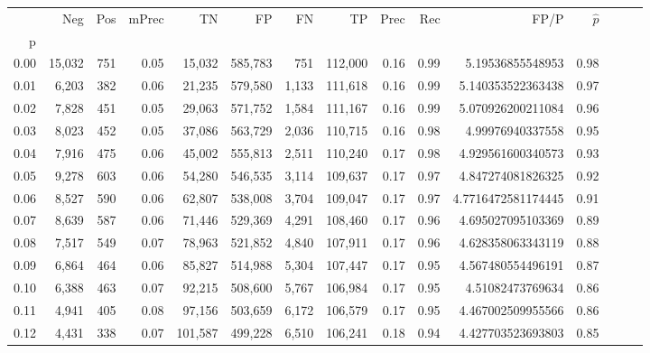 \begin{tabular}{rrrrrrrrrrrrrrr}
\toprule
{} &     Neg &    Pos & mPrec &       TN &       FP &       FN &       TP &  Prec &   Rec &                  FP/P & $\hat{p}$ \\
p    &         &        &       &          &          &          &          &       &       &                       &           \\
\midrule
0.00 &  15,032 &    751 &  0.05 &   15,032 &  585,783 &      751 &  112,000 &  0.16 &  0.99 &      5.19536855548953 &      0.98 \\
0.01 &   6,203 &    382 &  0.06 &   21,235 &  579,580 &    1,133 &  111,618 &  0.16 &  0.99 &     5.140353522363438 &      0.97 \\
0.02 &   7,828 &    451 &  0.05 &   29,063 &  571,752 &    1,584 &  111,167 &  0.16 &  0.99 &     5.070926200211084 &      0.96 \\
0.03 &   8,023 &    452 &  0.05 &   37,086 &  563,729 &    2,036 &  110,715 &  0.16 &  0.98 &      4.99976940337558 &      0.95 \\
0.04 &   7,916 &    475 &  0.06 &   45,002 &  555,813 &    2,511 &  110,240 &  0.17 &  0.98 &     4.929561600340573 &      0.93 \\
0.05 &   9,278 &    603 &  0.06 &   54,280 &  546,535 &    3,114 &  109,637 &  0.17 &  0.97 &     4.847274081826325 &      0.92 \\
0.06 &   8,527 &    590 &  0.06 &   62,807 &  538,008 &    3,704 &  109,047 &  0.17 &  0.97 &    4.7716472581174445 &      0.91 \\
0.07 &   8,639 &    587 &  0.06 &   71,446 &  529,369 &    4,291 &  108,460 &  0.17 &  0.96 &     4.695027095103369 &      0.89 \\
0.08 &   7,517 &    549 &  0.07 &   78,963 &  521,852 &    4,840 &  107,911 &  0.17 &  0.96 &     4.628358063343119 &      0.88 \\
0.09 &   6,864 &    464 &  0.06 &   85,827 &  514,988 &    5,304 &  107,447 &  0.17 &  0.95 &     4.567480554496191 &      0.87 \\
0.10 &   6,388 &    463 &  0.07 &   92,215 &  508,600 &    5,767 &  106,984 &  0.17 &  0.95 &      4.51082473769634 &      0.86 \\
0.11 &   4,941 &    405 &  0.08 &   97,156 &  503,659 &    6,172 &  106,579 &  0.17 &  0.95 &     4.467002509955566 &      0.86 \\
0.12 &   4,431 &    338 &  0.07 &  101,587 &  499,228 &    6,510 &  106,241 &  0.18 &  0.94 &     4.427703523693803 &      0.85 \\

\end{tabular}
